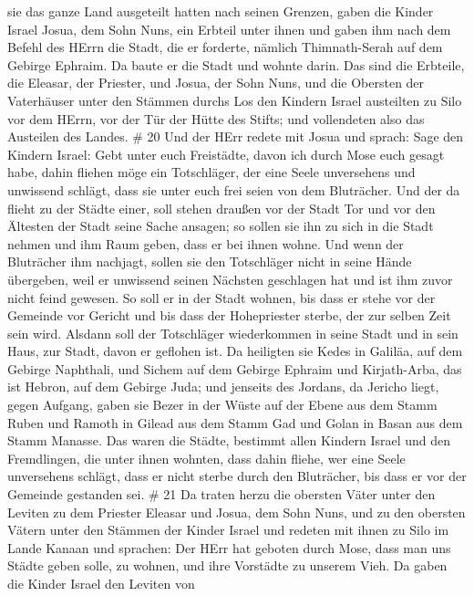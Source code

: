 sie das ganze Land ausgeteilt hatten nach seinen Grenzen, gaben die
Kinder Israel Josua, dem Sohn Nuns, ein Erbteil unter ihnen
 und gaben ihm nach dem Befehl des HErrn die Stadt, die er
forderte, nämlich Thimnath-Serah auf dem Gebirge Ephraim. Da baute er
die Stadt und wohnte darin.  Das sind die Erbteile, die
Eleasar, der Priester, und Josua, der Sohn Nuns, und die Obersten der
Vaterhäuser unter den Stämmen durchs Los den Kindern Israel austeilten
zu Silo vor dem HErrn, vor der Tür der Hütte des Stifts; und vollendeten
also das Austeilen des Landes. \# 20  Und der HErr redete
mit Josua und sprach:  Sage den Kindern Israel: Gebt unter
euch Freistädte, davon ich durch Mose euch gesagt habe, 
dahin fliehen möge ein Totschläger, der eine Seele unversehens und
unwissend schlägt, dass sie unter euch frei seien von dem Bluträcher.
 Und der da flieht zu der Städte einer, soll stehen draußen
vor der Stadt Tor und vor den Ältesten der Stadt seine Sache ansagen; so
sollen sie ihn zu sich in die Stadt nehmen und ihm Raum geben, dass er
bei ihnen wohne.  Und wenn der Bluträcher ihm nachjagt,
sollen sie den Totschläger nicht in seine Hände übergeben, weil er
unwissend seinen Nächsten geschlagen hat und ist ihm zuvor nicht feind
gewesen.  So soll er in der Stadt wohnen, bis dass er stehe
vor der Gemeinde vor Gericht und bis dass der Hohepriester sterbe, der
zur selben Zeit sein wird. Alsdann soll der Totschläger wiederkommen in
seine Stadt und in sein Haus, zur Stadt, davon er geflohen ist.
 Da heiligten sie Kedes in Galiläa, auf dem Gebirge
Naphthali, und Sichem auf dem Gebirge Ephraim und Kirjath-Arba, das ist
Hebron, auf dem Gebirge Juda;  und jenseits des Jordans, da
Jericho liegt, gegen Aufgang, gaben sie Bezer in der Wüste auf der Ebene
aus dem Stamm Ruben und Ramoth in Gilead aus dem Stamm Gad und Golan in
Basan aus dem Stamm Manasse.  Das waren die Städte, bestimmt
allen Kindern Israel und den Fremdlingen, die unter ihnen wohnten, dass
dahin fliehe, wer eine Seele unversehens schlägt, dass er nicht sterbe
durch den Bluträcher, bis dass er vor der Gemeinde gestanden sei. \# 21
 Da traten herzu die obersten Väter unter den Leviten zu dem
Priester Eleasar und Josua, dem Sohn Nuns, und zu den obersten Vätern
unter den Stämmen der Kinder Israel  und redeten mit ihnen
zu Silo im Lande Kanaan und sprachen: Der HErr hat geboten durch Mose,
dass man uns Städte geben solle, zu wohnen, und ihre Vorstädte zu
unserem Vieh.  Da gaben die Kinder Israel den Leviten von
